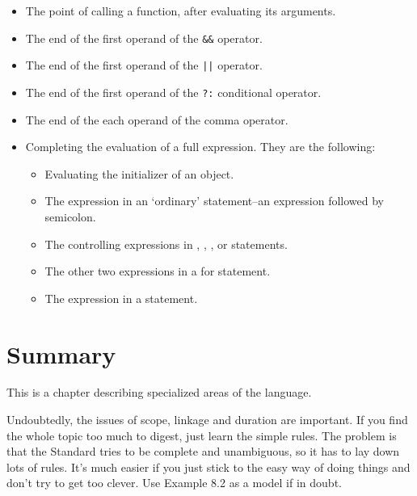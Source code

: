   \begin{itemize}
   \item The point of calling a function, after evaluating its arguments.

   \item The end of the first operand of the \texttt{\&\&}
    operator.

   \item The end of the first operand of the \texttt{||} operator.

   \item The end of the first operand of the \texttt{?:} conditional
    operator.

   \item The end of the each operand of the comma operator.

   \item Completing the evaluation of a full expression. They are the
    following:

    \begin{itemize}
     \item Evaluating the initializer of an \auto{} object.

     \item The expression in an `ordinary' statement--an expression
      followed by semicolon.

     \item The controlling expressions in \kdo, \while,
      \kif, \switch{} or \for{}
      statements.

     \item The other two expressions in a for statement.

     \item The expression in a \return{} statement.
    \end{itemize}
   
  \end{itemize}

 
        \section{Summary}
        


  This is a chapter describing specialized areas of the language.


  Undoubtedly, the issues of scope, linkage and duration are important.
   If you find the whole topic too much to digest, just learn the simple
   rules. The problem is that the Standard tries to be complete and
   unambiguous, so it has to lay down lots of rules. It's much easier if
   you just stick to the easy way of doing things and don't try to get
   too clever. Use Example 8.2 as a model if in doubt.


